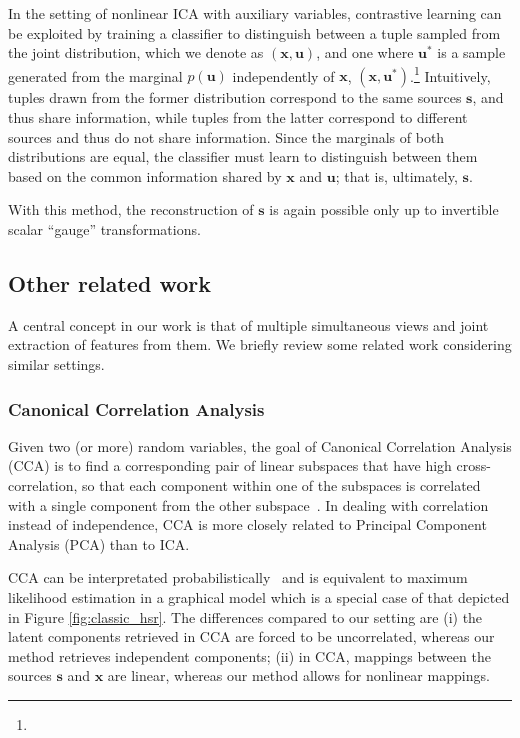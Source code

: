 In the setting of nonlinear ICA with auxiliary variables, contrastive learning can be exploited by training a classifier to distinguish between a tuple sampled from the joint distribution, which we denote as $(\bm{x}, \bm{u})$, and one where $\bm{u}^*$ is a sample generated from the marginal $p(\bm{u})$ independently of $\bm{x}$, $(\bm{x}, \bm{u}^*)$.\footnote{}
Intuitively, tuples drawn from the former distribution correspond to the same sources $\bm{s}$, and thus share information, while tuples from the latter correspond to different sources and thus do not share information.
Since the marginals of both distributions are equal, the classifier must learn to distinguish between them based on the common information shared by $\bm{x}$ and $\bm{u}$; that is, ultimately, $\bm{s}$.

With this method, the reconstruction of $\bm{s}$ is again possible only up to invertible scalar ``gauge'' transformations. 


\subsection{Other related work}\label{sec:related-work}
A central concept in our work is that of multiple simultaneous views and joint extraction of features from them. We briefly review some related work considering similar settings.
\subsubsection{Canonical Correlation Analysis}
\label{sec:probacca}
Given two (or more) random variables, the goal of Canonical Correlation Analysis (CCA) \citep{hotelling1992relations} is to find a corresponding pair of linear subspaces that have high cross-correlation, so that each component within one of the subspaces is correlated with a single component from the other subspace~\citep{bishop2006pattern}.
In dealing with correlation instead of independence, CCA is more closely related to Principal Component Analysis (PCA) than to ICA.

CCA can be interpretated probabilistically~\citep{bach2005probabilistic} and is equivalent to maximum likelihood estimation in a graphical model which is a special case of that depicted in Figure \ref{fig:classic_hsr}.
The differences compared to our setting are (i) the latent components retrieved in CCA are forced to be uncorrelated, whereas our method retrieves independent components; (ii) in CCA, mappings between the sources $\bm{s}$ and $\bm{x}$ are linear, whereas our method allows for nonlinear mappings.

